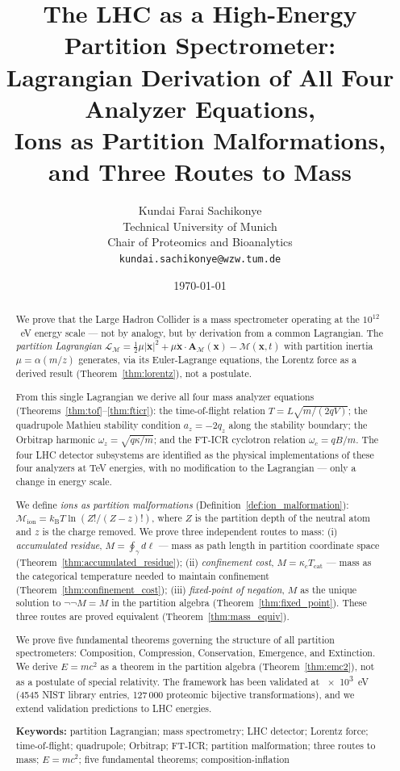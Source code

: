 \documentclass[twocolumn,10pt,a4paper]{article}
\title{\textbf{The LHC as a High-Energy Partition Spectrometer:\\
Lagrangian Derivation of All Four Analyzer Equations,\\
Ions as Partition Malformations, and Three Routes to Mass}}
\author{
Kundai Farai Sachikonye\\
Technical University of Munich\\
Chair of Proteomics and Bioanalytics\\
\texttt{kundai.sachikonye@wzw.tum.de}
}
\date{\today}
\theoremstyle{thmstyle}
\theoremstyle{definition}
\theoremstyle{remark}
\newcommand{\kB}{k_{\mathrm{B}}}
\newcommand{\LM}{\mathcal{L}_{\mathcal{M}}}
\newcommand{\AM}{\mathbf{A}_{\mathcal{M}}}
\newcommand{\Mop}{\mathcal{M}}
\newcommand{\Tcat}{T_{\mathrm{cat}}}
\begin{document}
\maketitle

\begin{abstract}
\noindent
We prove that the Large Hadron Collider is a mass spectrometer operating
at the $10^{12}$~eV energy scale --- not by analogy, but by derivation
from a common Lagrangian. The \emph{partition Lagrangian}
$\LM = \tfrac{1}{2}\mu|\dot{\mathbf{x}}|^2
+ \mu\dot{\mathbf{x}}\cdot\AM(\mathbf{x}) - \Mop(\mathbf{x},t)$
with partition inertia $\mu = \alpha(m/z)$ generates, via its
Euler-Lagrange equations, the Lorentz force as a derived result
(Theorem~\ref{thm:lorentz}), not a postulate.

From this single Lagrangian we derive all four mass analyzer equations
(Theorems~\ref{thm:tof}--\ref{thm:fticr}): the time-of-flight relation
$T = L\sqrt{m/(2qV)}$; the quadrupole Mathieu stability condition
$a_z = -2q_z$ along the stability boundary; the Orbitrap harmonic
$\omega_z = \sqrt{q\kappa/m}$; and the FT-ICR cyclotron relation
$\omega_c = qB/m$. The four LHC detector subsystems are identified
as the physical implementations of these four analyzers at TeV energies,
with no modification to the Lagrangian --- only a change in energy scale.

We define \emph{ions as partition malformations}
(Definition~\ref{def:ion_malformation}):
$\Mop_{\mathrm{ion}} = \kB T \ln(Z!/(Z-z)!)$,
where $Z$ is the partition depth of the neutral atom and $z$ is the
charge removed. We prove three independent routes to mass:
(i) \emph{accumulated residue}, $M = \oint_\gamma d\ell$ --- mass as path
length in partition coordinate space
(Theorem~\ref{thm:accumulated_residue});
(ii) \emph{confinement cost}, $M = \kappa_c \Tcat$ --- mass as the
categorical temperature needed to maintain confinement
(Theorem~\ref{thm:confinement_cost});
(iii) \emph{fixed-point of negation}, $M$ as the unique solution to
$\lnot\lnot M = M$ in the partition algebra
(Theorem~\ref{thm:fixed_point}).
These three routes are proved equivalent (Theorem~\ref{thm:mass_equiv}).

We prove five fundamental theorems governing the structure of all
partition spectrometers: Composition, Compression, Conservation,
Emergence, and Extinction. We derive $E = mc^2$ as a theorem in the
partition algebra (Theorem~\ref{thm:emc2}), not as a postulate of special
relativity. The framework has been validated at \num{e3}~eV (4545 NIST
library entries, 127\,000 proteomic bijective transformations), and
we extend validation predictions to LHC energies.

\medskip
\noindent\textbf{Keywords:} partition Lagrangian; mass spectrometry;
LHC detector; Lorentz force; time-of-flight; quadrupole; Orbitrap;
FT-ICR; partition malformation; three routes to mass; $E=mc^2$;
five fundamental theorems; composition-inflation
\end{abstract}
\end{document}
